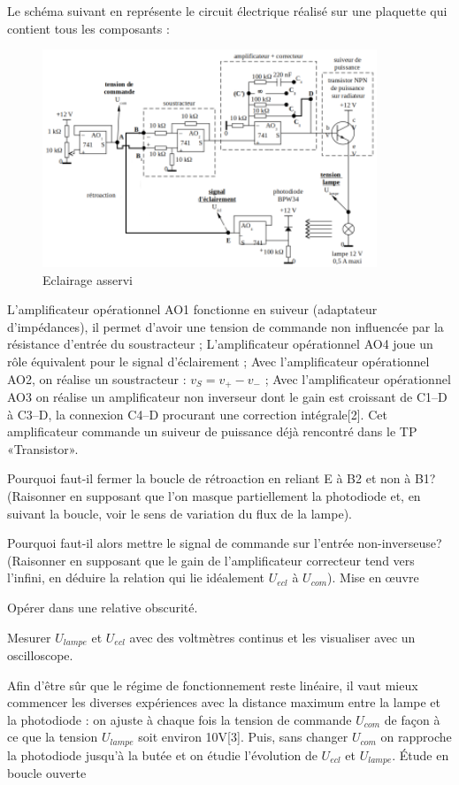 \documentclass{article}%
\begin{document}
Le schéma suivant en représente le circuit électrique réalisé sur une plaquette qui contient tous les composants :
\begin{figure}
	\centerline{\includegraphics[width=10cm]{images-exp/Asservissement_eclair_plan.png}}
	\caption{Eclairage asservi}
\end{figure}

    L'amplificateur opérationnel AO1 fonctionne en suiveur (adaptateur d'impédances), il permet d'avoir une tension de commande non influencée par la résistance d'entrée du soustracteur ;
    L'amplificateur opérationnel AO4 joue un rôle équivalent pour le signal d'éclairement ;
    Avec l'amplificateur opérationnel AO2, on réalise un soustracteur : $v_{S}=v_{+}-v_{-}$ ;
    Avec l'amplificateur opérationnel AO3 on réalise un amplificateur non inverseur dont le gain est croissant de C1--D à C3--D, la connexion C4--D procurant une correction intégrale[2]. Cet amplificateur commande un suiveur de puissance déjà rencontré dans le TP «Transistor».

Pourquoi faut-il fermer la boucle de rétroaction en reliant E à B2 et non à B1? (Raisonner en supposant que l'on masque partiellement la photodiode et, en suivant la boucle, voir le sens de variation du flux de la lampe).

Pourquoi faut-il alors mettre le signal de commande sur l'entrée non-inverseuse? (Raisonner en supposant que le gain de l'amplificateur correcteur tend vers l'infini, en déduire la relation qui lie idéalement $U_{ecl}$ à $U_{com}$).
Mise en œuvre

Opérer dans une relative obscurité.

Mesurer $U_{lampe}$ et $U_{ecl}$ avec des voltmètres continus et les visualiser avec un oscilloscope.

Afin d'être sûr que le régime de fonctionnement reste linéaire, il vaut mieux commencer les diverses expériences avec la distance maximum entre la lampe et la photodiode : on ajuste à chaque fois la tension de commande $U_{com}$ de façon à ce que la tension $U_{lampe}$ soit environ 10V[3]. Puis, sans changer $U_{com}$ on rapproche la photodiode jusqu'à la butée et on étudie l'évolution de $U_{ecl}$ et $U_{lampe}$.
Étude en boucle ouverte
\end{document}
